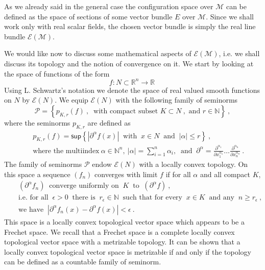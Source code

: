 \documentclass[11pt]{book}
\renewcommand{\sup}{\mathsf{sup}}
\newcommand{\abs}[1]{\left|#1\right|}
\newcommand{\Ecal}{\mathcal{E}}
\newcommand{\Mcal}{\mathcal{M}}
\newcommand{\Pcal}{\mathcal{P}}
\newcommand{\Nbb}{\mathbb{N}}
\newcommand{\Rbb}{\mathbb{R}}
\theoremstyle{break}
\begin{document}
As we already said in the general case the configuration space over $\Mcal$ can be defined as the space of sections of some vector bundle $E$ over $\Mcal$. Since we shall work only with real scalar fields, the chosen vector bundle is simply the real line bundle $\Ecal(\Mcal)$.


We would like now to discuss some mathematical aspects of $\Ecal(\Mcal)$, i.e. we shall discuss its topology and the notion of convergence on it. We start by looking at the space of functions of the form
%
\begin{equation*}
f : N \subset \Rbb^n \to \Rbb \ 
\end{equation*}
%
Using L. Schwartz's notation we denote the space of real valued smooth functions on $N$ by $\Ecal(N)$. We equip $\Ecal(N)$ with the following family of seminorms
%
\begin{equation}
\Pcal = \left\{ p_{K,r}(f) \ , \ \mbox{ with compact subset } K \subset N \ , \mbox{ and } r \in \Nbb \right\} \ ,
\label{eq:family_seminorm}
\end{equation}
%
where the seminorms $p_{K,r}$ are defined as
%
\begin{eqnarray*}
&& p_{K,r}(f) = \sup \left\{ \abs{\partial^\alpha f(x)} \ \mbox{ with } \ x \in N \ \mbox{ and } \ \abs{\alpha} \leq r  \right\} \ , \\
&& \mbox{where the multiindex} \ \alpha \in \Nbb^n, \ \abs{\alpha} = \sum_{i=1}^n \alpha_i, \ \mbox{ and } \ \partial^\alpha = \frac{\partial^{\alpha_1}}{\partial x_1^{\alpha_1}} \dots \frac{\partial^{\alpha_n}}{\partial x_n^{\alpha_n}} \ .
\end{eqnarray*}
%
The family of seminorms $\Pcal$ endow $\Ecal(N)$ with a locally convex topology. On this space a sequence $(f_n)$ converges with limit $f$ if for all $\alpha$ and all compact $K$,
%
\begin{eqnarray*}
&& (\partial^\alpha f_n) \ \mbox{ converge uniformly on } \ K \ \mbox{ to } \ (\partial^\alpha f) \ , \\
&& \mbox{i.e. for all } \ \epsilon > 0 \ \mbox{ there is } \ r_\epsilon \in \Nbb \ \mbox{ such that for every } \  x \in K \ \mbox{ and any } \ n \geq r_\epsilon \ , \\
&& \mbox{we have } \ \abs{\partial^\alpha f_n(x) - \partial^\alpha f(x)} < \epsilon \ . 
\end{eqnarray*}
%
This space is a locally convex topological vector space which appears to be a Frechet space. We recall that a Frechet space is a complete locally convex topological vector space with a metrizable topology. It can be shown that a locally convex topological vector space is metrizable if and only if the topology can be defined as a countable family of seminorm.
\end{document}
